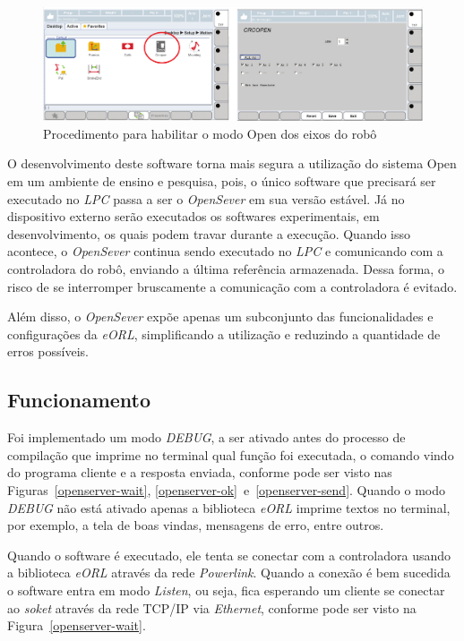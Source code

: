     \begin{figure}[ht]
        \centering
        \includegraphics[width=\columnwidth]{imagens/Softwares/habilitar-open.png}
        \small 
        \centering 
        \caption{Procedimento para habilitar o modo Open dos eixos do robô~\citep{Open:Manual}}
        \label{habilitar-open}
    \end{figure}
    
    O desenvolvimento deste software torna mais segura a utilização do sistema Open em um ambiente de ensino e pesquisa, pois, o único software que precisará ser executado no \textit{LPC} passa a ser o \textit{OpenSever} em sua versão estável. Já no dispositivo externo serão executados os softwares experimentais, em desenvolvimento, os quais podem travar durante a execução. Quando isso acontece, o \textit{OpenSever} continua sendo executado no \textit{LPC} e comunicando com a controladora do robô, enviando a última referência armazenada. Dessa forma, o risco de se interromper bruscamente a comunicação com a controladora é evitado.
    
    Além disso, o \textit{OpenSever} expõe apenas um subconjunto das funcionalidades e configurações da \textit{eORL}, simplificando a utilização e reduzindo a quantidade de erros possíveis.
    
    \subsection{Funcionamento}
    
        Foi implementado um modo \textit{DEBUG}, a ser ativado antes do processo de compilação que imprime no terminal qual função foi executada, o comando vindo do programa cliente e a resposta enviada, conforme pode ser visto nas Figuras~\ref{openserver-wait}, \ref{openserver-ok}~e~\ref{openserver-send}. Quando o modo \textit{DEBUG} não está ativado apenas a biblioteca \textit{eORL} imprime textos no terminal, por exemplo, a tela de boas vindas, mensagens de erro, entre outros.
        
        Quando o software é executado, ele tenta se conectar com a controladora usando a biblioteca \textit{eORL} através da rede \textit{Powerlink}. Quando a conexão é bem sucedida o software entra em modo \textit{Listen}, ou seja, fica esperando um cliente se conectar ao \textit{soket} através da rede TCP/IP via \textit{Ethernet}, conforme pode ser visto na Figura~\ref{openserver-wait}.
        
